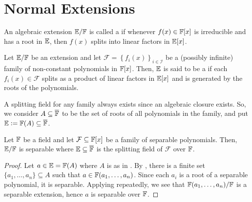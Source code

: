 \section{Normal Extensions}

\begin{defn}
    An algebraic extension $\mathbb{E}/\mathbb{F}$ is called a  if whenever $f(x) \in \mathbb{F}[x]$ is irreducible and has a root in $\mathbb{E}$, then $f(x)$ splits into linear factors in $\mathbb{E}[x]$.
\end{defn}

\begin{defn}
    Let $\mathbb{E}/\mathbb{F}$ be an extension and let $\mathcal{F} = \left\{ f_i(x) \right\}_{i \in \mathcal{I}}$ be a (possibly infinite) family of non-constant polynomials in $\mathbb{F}[x]$. Then, $\mathbb{E}$ is said to be a  if each $f_i(x) \in \mathcal{F}$ splits as a product of linear factors in $\mathbb{E}[x]$ and is generated by the roots of the polynomials. 
\end{defn}

\begin{rem} \label{rem:splitting-field-for-family-exists}
    A splitting field for any family always exists since an algebraic closure exists. So, we consider $A \subseteq \overline{\mathbb{F}}$ to be the set of roots of all polynomials in the family, and put $\mathbb{E} \vcentcolon= \mathbb{F}(A) \subseteq \overline{\mathbb{F}}$.
\end{rem}

\begin{prop}
    Let $\mathbb{F}$ be a field and let $\mathcal{F} \subseteq \mathbb{F}[x]$ be a family of separable polynomials. Then, $\mathbb{E}/\mathbb{F}$ is separable where $\mathbb{E} \subseteq \overline{\mathbb{F}}$ is the splitting field of $\mathcal{F}$ over $\mathbb{F}$.
\end{prop}

\begin{proof}
    Let $a \in \mathbb{E} = \mathbb{F}(A)$ where $A$ is as in . By , there is a finite set $\{a_1, \ldots, a_n\} \subseteq A$ such that $a \in \mathbb{F}(a_1, \ldots, a_n)$. Since each $a_i$ is a root of a separable polynomial, it is separable. Applying  repeatedly, we see that $\mathbb{F}(a_1,\ldots,a_n)/\mathbb{F}$ is a separable extension, hence $a$ is separable over $\mathbb{F}$.
\end{proof}

